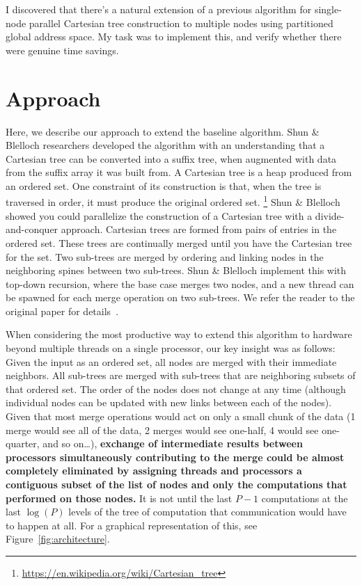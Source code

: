 \documentclass[10pt]{article}
\begin{document}
I discovered that there's a natural extension of a previous algorithm for single-node parallel Cartesian tree construction to multiple nodes using partitioned global address space.
My task was to implement this, and verify whether there were genuine time savings.
\fi

\section{Approach}

Here, we describe our approach to extend the baseline algorithm.
Shun \& Blelloch researchers developed the algorithm with an understanding that a Cartesian tree can be
converted into a suffix tree, when augmented with data from the suffix array it was built from.
A Cartesian tree is a heap produced from an ordered set.
One constraint of its construction is that, when the tree is traversed in order,
it must produce the original ordered set.
\footnote{\url{https://en.wikipedia.org/wiki/Cartesian_tree}}
Shun \& Blelloch showed you could parallelize the construction of a Cartesian tree with a
divide-and-conquer approach.
Cartesian trees are formed from pairs of entries in the ordered set.
These trees are continually merged until you have the Cartesian tree for the set.
Two sub-trees are merged by ordering and linking nodes in the neighboring spines between
two sub-trees.
Shun \& Blelloch implement this with top-down recursion, where the base case merges two nodes, and
a new thread can be spawned for each merge operation on two sub-trees.
We refer the reader to the original paper for details~\cite{shun_simple_2014}.

When considering the most productive way to extend this algorithm to hardware beyond multiple
threads on a single processor, our key insight was as follows:
Given the input as an ordered set, all nodes are merged with their immediate neighbors.
All sub-trees are merged with sub-trees that are neighboring subsets of that ordered set.
The order of the nodes does not change at any time (although individual nodes can be updated with
new links between each of the nodes).
Given that most merge operations would act on only a small chunk of the data (1 merge would
see all of the data, 2 merges would see one-half, 4 would see one-quarter, and so on\ldots{}),
\textbf{exchange of intermediate results between processors simultaneously contributing to the merge
could be almost completely eliminated by assigning threads and processors a contiguous subset
of the list of nodes and only the computations that performed on those nodes.}
It is not until the last $P - 1$ computations at the last $\log (P)$ levels of the
tree of computation that communication would have to happen at all.
For a graphical representation of this, see Figure~\ref{fig:architecture}.
\end{document}
